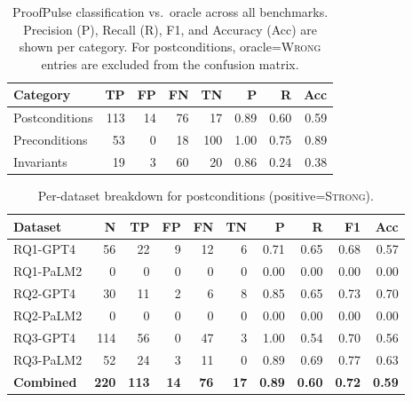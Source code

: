\begin{table}[h]
  \centering
  \caption{ProofPulse classification vs.\ oracle across all benchmarks. Precision (P), Recall (R), F1, and Accuracy (Acc) are shown per category. For postconditions, oracle=\textsc{Wrong} entries are excluded from the confusion matrix.}
  \label{tab:overall-results}
  \begin{tabular}{lrrrrrrr}
    \toprule
    \textbf{Category} & \textbf{TP} & \textbf{FP} & \textbf{FN} & \textbf{TN} & \textbf{P} & \textbf{R} & \textbf{Acc} \\
    \midrule
    Postconditions & 113 & 14 & 76 & 17 & 0.89 & 0.60 & 0.59 \\
    Preconditions  & 53 & 0 & 18 & 100 & 1.00 & 0.75 & 0.89 \\
    Invariants     & 19 & 3 & 60 & 20 & 0.86 & 0.24 & 0.38 \\
    \bottomrule
  \end{tabular}
\end{table}

\begin{table}[h]
  \centering
  \caption{Per-dataset breakdown for postconditions (positive=\textsc{Strong}).}
  \label{tab:postconditions}
  \begin{tabular}{lrrrrrrrrr}
    \toprule
    \textbf{Dataset} & \textbf{N} & \textbf{TP} & \textbf{FP} & \textbf{FN} & \textbf{TN} & \textbf{P} & \textbf{R}  & \textbf{F1} & \textbf{Acc} \\
    \midrule
    RQ1-GPT4  & 56  & 22 & 9 & 12 &  6 & 0.71 & 0.65 & 0.68 & 0.57 \\
    RQ1-PaLM2  & 0  & 0 & 0 & 0 &  0 & 0.00 & 0.00 & 0.00 & 0.00 \\
    RQ2-GPT4  & 30  & 11 & 2 & 6 &  8 & 0.85 & 0.65 & 0.73 & 0.70 \\
    RQ2-PaLM2  & 0  & 0 & 0 & 0 &  0 & 0.00 & 0.00 & 0.00 & 0.00 \\
    RQ3-GPT4  & 114  & 56 & 0 & 47 &  3 & 1.00 & 0.54 & 0.70 & 0.56 \\
    RQ3-PaLM2  & 52  & 24 & 3 & 11 &  0 & 0.89 & 0.69 & 0.77 & 0.63 \\
    \midrule
    \textbf{Combined} & \textbf{220} & \textbf{113} & \textbf{14} & \textbf{76} & \textbf{17} & \textbf{0.89} & \textbf{0.60} & \textbf{0.72} & \textbf{0.59} \\
    \bottomrule
  \end{tabular}
\end{table}

